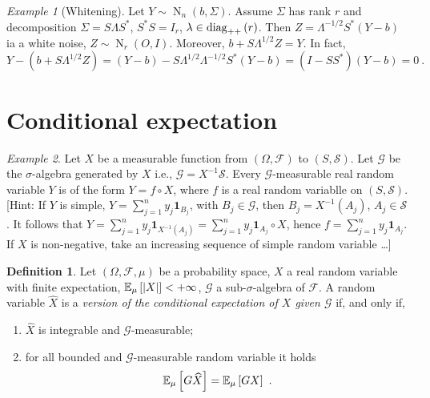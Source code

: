 \documentclass[12pt,a4paper]{amsart}
\newcommand{\gaussian}[3]{\operatorname{N}_{#1}\left(#2,#3\right)}
\newcommand{\one}{\bm 1}
\newcommand{\ppdiag}[1]{\diag_{++}\left(#1\right)}
\theoremstyle{plain}%
\theoremstyle{definition}
\newtheorem{definition}{Definition}%
\theoremstyle{remark}
\newtheorem{example}{Example}
\begin{document}
\begin{example}[Whitening]
  Let $Y \sim \gaussian n b \Sigma$. Assume $\Sigma$ has rank $r$ and decomposition $\Sigma = S \Lambda S^*$, $S^*S=I_r$, $\lambda \in \ppdiag r$. Then $Z = \Lambda^{-{1/2}} S^* (Y-b)$ ia a white noise, $Z \sim \gaussian r O I$. Moreover, $b + S\Lambda^{1/2} Z = Y$. In fact, 
  \begin{equation*}
    Y - (b + S\Lambda^{1/2} Z) = (Y-b) - S\Lambda^{1/2}\Lambda^{-1/2}S^*(Y-b) = (I-SS^*)(Y-b) = 0 \ .
  \end{equation*}
\end{example}

\section{Conditional expectation}

\begin{example}
Let $X$ be a measurable function from $(\Omega,\mathcal F)$ to $(S,\mathcal S)$. Let $\mathcal G$ be the $\sigma$-algebra generated by $X$ i.e., $\mathcal G = X^{-1} \mathcal S$. Every $\mathcal G$-measurable real random variable $Y$ is of the form $Y = f \circ X$, where $f$ is a real random variablle on $(S,\mathcal S)$. [Hint: If $Y$ is simple, $Y = \sum_{j=1}^n y_j \one_{B_j}$, with $B_j \in \mathcal G$, then $B_j = X^{-1}(A_j)$, $A_j \in \mathcal S$. It follows that $Y = \sum_{j=1}^n y_j \one_{X^{-1}(A_j)} = \sum_{j=1}^n y_j \one_{A_j}\circ X$, hence $f = \sum_{j=1}^n y_j \one_{A_j}$. If $X$ is non-negative, take an increasing sequence of simple random variable \dots]
\end{example}

\begin{definition}
Let $(\Omega, \mathcal F, \mu)$ be a probability space, $X$ a real random variable with finite expectation, $\operatorname{\mathbb E}_{\mu}\left[\left\vert X\right\vert\right] < + \infty$, $\mathcal G$ a sub-$\sigma$-algebra of $\mathcal F$. A random variable $\widehat X$ is a \emph{version of the conditional expectation of $X$ given $\mathcal G$} if, and only if,
\begin{enumerate}
\item $\widehat X$ is integrable and $\mathcal G$-measurable;
\item for all bounded and $\mathcal G$-measurable random variable it holds
  \begin{equation*}
    \operatorname{\mathbb E}_{\mu}\left[G\widehat X\right] = \operatorname{\mathbb E}_{\mu}\left[GX\right] \ .
  \end{equation*}
\end{enumerate}
\end{definition}
\end{document}
